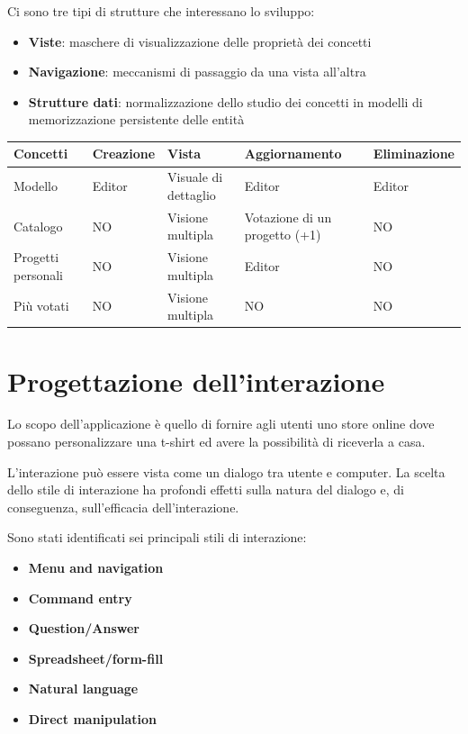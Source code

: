 \documentclass[12pt,italian,]{report}
\providecommand{\tightlist}{%
  \setlength{\itemsep}{0pt}\setlength{\parskip}{0pt}}
\begin{document}
Ci sono tre tipi di strutture che interessano lo sviluppo:

\begin{itemize}
\tightlist
\item
  \textbf{Viste}: maschere di visualizzazione delle proprietà dei
  concetti
\item
  \textbf{Navigazione}: meccanismi di passaggio da una vista all'altra
\item
  \textbf{Strutture dati}: normalizzazione dello studio dei concetti in
  modelli di memorizzazione persistente delle entità
\end{itemize}

\begin{longtable}[]{@{}lllll@{}}
\toprule
Concetti & Creazione & Vista & Aggiornamento &
Eliminazione\tabularnewline
\midrule
\endhead
Modello & Editor & Visuale di dettaglio & Editor & Editor\tabularnewline
Catalogo & NO & Visione multipla & Votazione di un progetto (+1) &
NO\tabularnewline
Progetti personali & NO & Visione multipla & Editor & NO\tabularnewline
Più votati & NO & Visione multipla & NO & NO\tabularnewline
\bottomrule
\end{longtable}

\hypertarget{progettazione-dellinterazione}{%
\section{Progettazione
dell'interazione}\label{progettazione-dellinterazione}}

Lo scopo dell'applicazione è quello di fornire agli utenti uno store
online dove possano personalizzare una t-shirt ed avere la possibilità
di riceverla a casa.

L'interazione può essere vista come un dialogo tra utente e computer. La
scelta dello stile di interazione ha profondi effetti sulla natura del
dialogo e, di conseguenza, sull'efficacia dell'interazione.

Sono stati identificati sei principali stili di interazione:

\begin{itemize}
\tightlist
\item
  \textbf{Menu and navigation}
\item
  \textbf{Command entry}
\item
  \textbf{Question/Answer}
\item
  \textbf{Spreadsheet/form-fill}
\item
  \textbf{Natural language}
\item
  \textbf{Direct manipulation}
\end{itemize}
\end{document}
